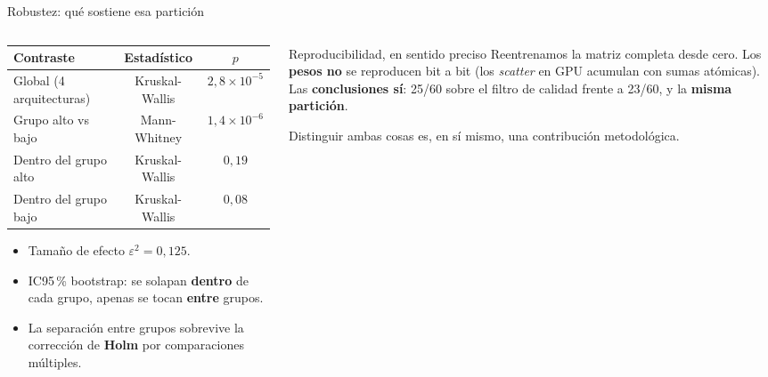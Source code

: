 \documentclass[aspectratio=169,11pt]{beamer}
\begin{document}
\begin{frame}{Robustez: qué sostiene esa partición}
\begin{columns}[T]
\begin{column}{0.54\textwidth}
\footnotesize
\begin{tabular}{lcc}
\toprule
\textbf{Contraste} & \textbf{Estadístico} & \textbf{$p$} \\
\midrule
Global (4 arquitecturas) & Kruskal-Wallis & $2{,}8\!\times\!10^{-5}$ \\
Grupo alto vs bajo & Mann-Whitney & $1{,}4\!\times\!10^{-6}$ \\
\midrule
Dentro del grupo alto & Kruskal-Wallis & $0{,}19$ \\
Dentro del grupo bajo & Kruskal-Wallis & $0{,}08$ \\
\bottomrule
\end{tabular}
\vspace{7pt}
\begin{itemize}\footnotesize
  \item Tamaño de efecto $\varepsilon^2 = 0{,}125$.
  \item IC95\,\% bootstrap: se solapan \textbf{dentro} de cada grupo, apenas se tocan \textbf{entre} grupos.
  \item La separación entre grupos sobrevive la corrección de \textbf{Holm} por comparaciones múltiples.
\end{itemize}
\end{column}
\begin{column}{0.44\textwidth}
\begin{block}{Reproducibilidad, en sentido preciso}
\footnotesize
Reentrenamos la matriz completa desde cero. Los \textbf{pesos no} se reproducen bit a bit (los \textit{scatter} en GPU acumulan con sumas atómicas).\\[4pt]
Las \textbf{conclusiones sí}: 25/60 sobre el filtro de calidad frente a 23/60, y la \textbf{misma partición}.
\end{block}
\vspace{2pt}
{\footnotesize\color{muted} Distinguir ambas cosas es, en sí mismo, una contribución metodológica.}
\end{column}
\end{columns}
\end{frame}
\end{document}
